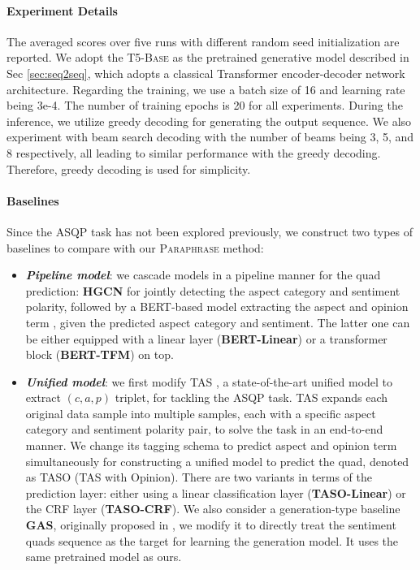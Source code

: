 \documentclass[11pt]{article}
\begin{document}
\paragraph{Experiment Details}
The averaged scores over five runs with different random seed initialization are reported.
We adopt the \textsc{T5-Base} \cite{t5-paper} as the pretrained generative model described in Sec \ref{sec:seq2seq}, which adopts a classical Transformer encoder-decoder network architecture.
Regarding the training, we use a batch size of 16 and learning rate being 3e-4. The number of training epochs is 20 for all experiments. 
During the inference, we utilize greedy decoding for generating the output sequence. We also experiment with beam search decoding with the number of beams being 3, 5, and 8 respectively, all leading to similar performance with the greedy decoding. Therefore, greedy decoding is used for simplicity.


\paragraph{Baselines}
Since the ASQP task has not been explored previously, we construct two types of baselines to compare with our \textsc{Paraphrase} method:
\begin{itemize}[leftmargin=*]
    \setlength{\itemsep}{0pt}
    \setlength{\parsep}{0pt}
    \setlength{\parskip}{0pt}
    
    \item \textbf{\textit{Pipeline model}}: we cascade models in a pipeline manner for the quad prediction: \textbf{HGCN} \cite{coling20-acsa} for jointly detecting the aspect category and sentiment polarity, followed by a BERT-based model extracting the aspect and opinion term \cite{wnut19-absa-bert}, given the predicted aspect category and sentiment. The latter one can be either equipped with a linear layer (\textbf{BERT-Linear}) or a transformer block (\textbf{BERT-TFM}) on top.
    
    \item \textbf{\textit{Unified model}}: we first modify TAS \cite{aaai20-tasd}, a state-of-the-art unified model to extract $(c, a, p)$ triplet, for tackling the ASQP task.
    TAS expands each original data sample into multiple samples, each with a specific aspect category and sentiment polarity pair, to solve the task in an end-to-end manner.
    We change its tagging schema to predict aspect and opinion term simultaneously for constructing a unified model to predict the quad, denoted as TASO (TAS with Opinion). There are two variants in terms of the prediction layer: either using a linear classification layer (\textbf{TASO-Linear}) or the CRF layer (\textbf{TASO-CRF}).
    We also consider a generation-type baseline \textbf{GAS}, originally proposed in \cite{acl21-gabsa}, we modify it to directly treat the sentiment quads sequence as the target for learning the generation model. It uses the same pretrained model as ours. 
\end{itemize}
\end{document}
